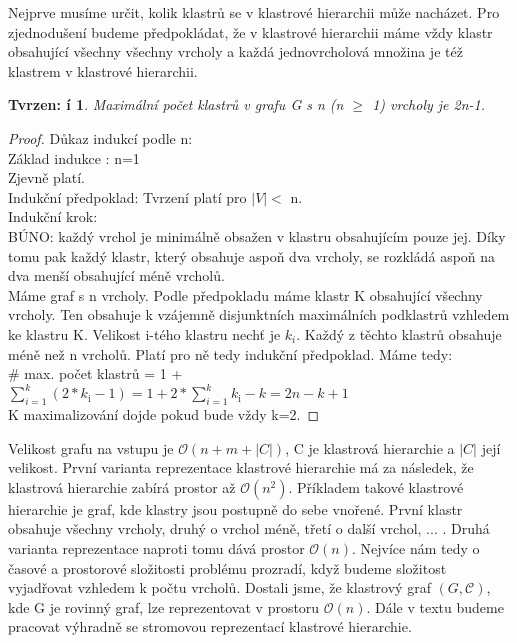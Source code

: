 \documentclass[12pt,a4report]{report}
\newtheorem{tvr}{Tvrzen: í}[chapter]
\begin{document}
Nejprve musíme určit, kolik klastrů se v klastrové hierarchii může nacházet.
Pro zjednodušení budeme předpokládat, že v klastrové hierarchii máme vždy klastr obsahující všechny všechny vrcholy a každá jednovrcholová množina je též klastrem v klastrové hierarchii.
\begin{tvr}
Maximální počet klastrů v grafu G s n (n $\geq$ 1) vrcholy je 2n-1.
\end{tvr}
\begin{proof}
Důkaz indukcí podle n: \\
Základ indukce : n=1 \\
Zjevně platí. \\
Indukční předpoklad: Tvrzení platí pro $|V| <$ n.\\
Indukční krok:  \\
BÚNO: každý vrchol je minimálně obsažen v klastru obsahujícím pouze jej.
Díky tomu pak každý klastr, který obsahuje aspoň dva vrcholy, se rozkládá aspoň na dva menší obsahující méně vrcholů. \\
Máme graf s n vrcholy. Podle předpokladu máme klastr K obsahující všechny vrcholy. Ten obsahuje k vzájemně disjunktních maximálních podklastrů vzhledem ke klastru K. Velikost i-tého klastru nechť je $k_i$. Každý z těchto klastrů obsahuje méně než n vrcholů. Platí pro ně tedy indukční předpoklad. Máme tedy: \\
$\#$ max. počet klastrů = 1 + $\sum\limits_{i=1}^k (2*k_{\text{i}}-1) = 1 + 2*\sum\limits_{i=1}^k k_{\text{i}} - k = 2n - k + 1 $\\
K maximalizování dojde pokud bude vždy k=2.
\end{proof}

Velikost grafu na vstupu je  $\mathcal{O}(n+m+|C|)$, C je klastrová hierarchie a $|C|$ její velikost. 
První varianta reprezentace klastrové hierarchie má za následek, že klastrová hierarchie zabírá prostor až $\mathcal{O}(n^2)$. Příkladem takové klastrové hierarchie je graf, kde klastry jsou postupně do sebe vnořené. První klastr obsahuje všechny vrcholy, druhý o vrchol méně, třetí o další vrchol, ... .
Druhá varianta reprezentace naproti tomu dává prostor $\mathcal{O}(n)$. Nejvíce nám tedy o časové a prostorové složitosti problému prozradí, když budeme složitost vyjadřovat vzhledem k počtu vrcholů. Dostali jsme, že klastrový graf $(G,\mathcal C )$, kde G je rovinný graf, lze reprezentovat v prostoru $\mathcal O (n)$. Dále v textu budeme pracovat výhradně se stromovou reprezentací klastrové hierarchie.
\end{document}
